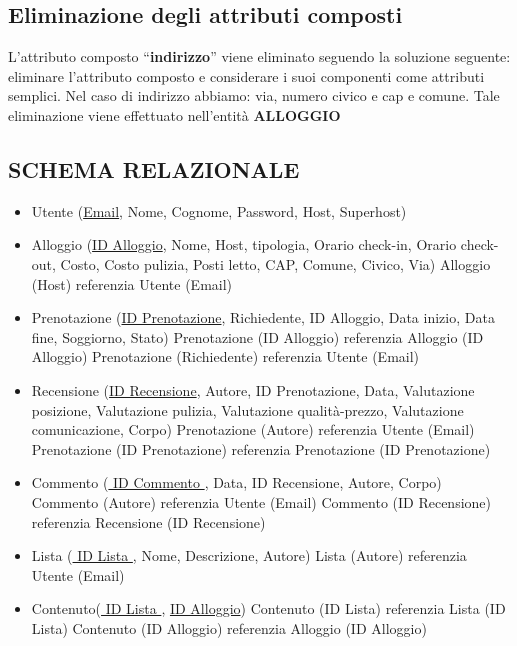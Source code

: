 \subsection{Eliminazione degli attributi composti}
L’attributo composto “\textbf{indirizzo}” viene eliminato seguendo la soluzione seguente: eliminare l’attributo composto e considerare i suoi componenti come attributi semplici. Nel caso di indirizzo abbiamo: via, numero civico e cap e comune.
Tale eliminazione viene effettuato nell'entità \textbf{ALLOGGIO}


\subsection{SCHEMA RELAZIONALE}
\begin{itemize}
  \item Utente (\underline{Email}, Nome, Cognome, Password, Host, Superhost)
  \item Alloggio (\underline{ID Alloggio}, Nome, Host, tipologia, Orario check-in, Orario check-out, Costo, Costo pulizia, Posti letto, CAP, Comune, Civico, Via)
        Alloggio (Host) referenzia Utente (Email)
  \item Prenotazione (\underline{ID Prenotazione}, Richiedente, ID Alloggio, Data inizio, Data fine, Soggiorno, Stato)
        Prenotazione (ID Alloggio) referenzia Alloggio (ID Alloggio)
        Prenotazione (Richiedente) referenzia Utente (Email)
  \item Recensione (\underline{ID Recensione}, Autore, ID Prenotazione, Data, Valutazione posizione, Valutazione pulizia, Valutazione qualità-prezzo, Valutazione comunicazione, Corpo)
        Prenotazione (Autore) referenzia Utente (Email)
        Prenotazione (ID Prenotazione) referenzia Prenotazione (ID Prenotazione)
  \item Commento (\underline{ ID Commento }, Data, ID Recensione, Autore, Corpo)
        Commento (Autore) referenzia Utente (Email)
        Commento (ID Recensione) referenzia Recensione (ID Recensione)
  \item Lista (\underline{ ID Lista }, Nome, Descrizione, Autore)
        Lista (Autore) referenzia Utente (Email)
  \item Contenuto(\underline{ ID Lista }, \underline{ID Alloggio})
        Contenuto (ID Lista) referenzia Lista (ID Lista)
        Contenuto (ID Alloggio) referenzia Alloggio (ID Alloggio)
\end{itemize}



